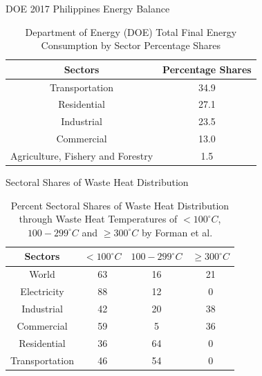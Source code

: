 \begin{frame}{DOE 2017 Philippines Energy Balance}
   \begin{table}
		\centering
		\caption{ Department of Energy (DOE) Total Final Energy Consumption by Sector Percentage Shares\cite{doe2017energysituationer}}
		 \begin{tabular}{cc}
			 \hline
			 Sectors & Percentage Shares \\
			 \hline
			 Transportation & 34.9 \\
			 Residential & 27.1 \\
			 Industrial & 23.5 \\
		     Commercial & 13.0 \\
			 Agriculture, Fishery and Forestry & 1.5 \\
			\hline
		  \end{tabular}
	\end{table}
\end{frame}

\begin{frame}{Sectoral Shares of Waste Heat Distribution}
	\begin{table}
		\centering
		\caption{\centering Percent Sectoral Shares of Waste Heat Distribution through Waste Heat Temperatures of $<100^{\circ}C$, $100-299^{\circ}C$ and $\geq300^{\circ}C$ by Forman et al. \cite{forman2016estimating}}
		\begin{tabular}{cccc}
			\hline
			Sectors & $<100^{\circ}C$ & $100-299^{\circ}C$ & $\geq300^{\circ}C$\\
			\hline
			World & 63 & 16 & 21\\
			Electricity & 88 & 12 & 0\\
			Industrial & 42 & 20 & 38\\
			Commercial & 59 & 5 & 36\\
			Residential & 36 & 64 & 0\\
			Transportation & 46 & 54 & 0\\
			\hline
		\end{tabular}
	\end{table}
\end{frame}

